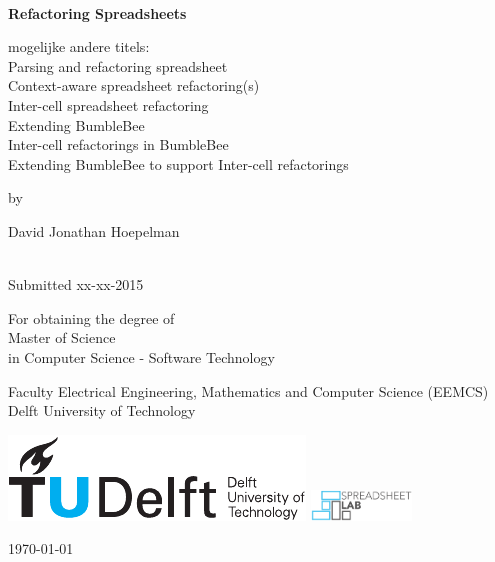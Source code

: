 \thispagestyle{empty}
\onecolumn
{%
\sffamily
\centering

~\vspace{\fill}

{\huge \bfseries
Refactoring Spreadsheets
}

\vspace{2.0cm}

mogelijke andere titels: \\
Parsing and refactoring spreadsheet \\
Context-aware spreadsheet refactoring(s)\\
Inter-cell spreadsheet refactoring\\
Extending BumbleBee\\
Inter-cell refactorings in BumbleBee\\
Extending BumbleBee to support Inter-cell refactorings\\


\vspace{2.0cm}

by

\vspace{2.0cm}

{\LARGE
David Jonathan Hoepelman
}

\vspace{3.0cm}

 \\
Submitted xx-xx-2015

\vspace{2.5cm}

For obtaining the degree of \\
Master of Science \\
in Computer Science - Software Technology \\

\vspace{0.5cm}

Faculty Electrical Engineering, Mathematics and Computer Science (EEMCS)\\
Delft University of Technology

\vspace{1.5cm}

\includegraphics{tudelft}
\hspace{0.5cm}
\includegraphics[height=8mm]{spreadsheet-lab}
\hspace{0.5cm}

\vspace{\fill}

\today

}